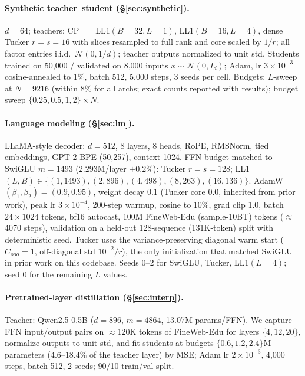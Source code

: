 \documentclass[11pt]{article}
\begin{document}
\paragraph{Synthetic teacher--student (\S\ref{sec:synthetic}).}
$d=64$; teachers: CP $=$ LL1$(B{=}32, L{=}1)$, LL1$(B{=}16, L{=}4)$, dense Tucker
$r{=}s{=}16$ with slices resampled to full rank and core scaled by $1/r$; all factor
entries i.i.d.\ $\mathcal N(0, 1/d)$; teacher outputs normalized to unit std. Students
trained on 50{,}000 / validated on 8{,}000 inputs $x\sim\mathcal N(0, I_d)$; Adam,
lr $3{\times}10^{-3}$ cosine-annealed to 1\%, batch 512, 5{,}000 steps, 3 seeds per
cell. Budgets: $L$-sweep at $N{=}9216$ (within 8\% for all archs; exact counts
reported with results); budget sweep $\{0.25, 0.5, 1, 2\}{\times}N$.

\paragraph{Language modeling (\S\ref{sec:lm}).}
LLaMA-style decoder: $d{=}512$, 8 layers, 8 heads, RoPE, RMSNorm, tied embeddings,
GPT-2 BPE (50{,}257), context 1024. FFN budget matched to SwiGLU $m{=}1493$
($2.293$M/layer $\pm 0.2\%$): Tucker $r{=}s{=}128$; LL1 $(L,B) \in
\{(1,1493),(2,896),(4,498),(8,263),(16,136)\}$. AdamW $(\beta_1,\beta_2)=(0.9,0.95)$,
weight decay 0.1 (Tucker core 0.0, inherited from prior work), peak lr
$3{\times}10^{-4}$, 200-step warmup, cosine to 10\%, grad clip 1.0, batch
$24\times1024$ tokens, bf16 autocast, 100M FineWeb-Edu (sample-10BT) tokens
($\approx$4070 steps), validation on a held-out 128-sequence (131K-token) split with
deterministic seed. Tucker uses the variance-preserving diagonal warm start
($C_{ooo}{=}1$, off-diagonal std $10^{-2}/r$), the only initialization that matched
SwiGLU in prior work on this codebase. Seeds 0--2 for SwiGLU, Tucker, LL1$(L{=}4)$;
seed 0 for the remaining $L$ values.

\paragraph{Pretrained-layer distillation (\S\ref{sec:interp}).}
Teacher: Qwen2.5-0.5B \citep{yang2024qwen25} ($d{=}896$, $m{=}4864$, 13.07M
params/FFN). We capture FFN input/output pairs on $\approx$120K tokens of FineWeb-Edu
for layers $\{4, 12, 20\}$, normalize outputs to unit std, and fit students at
budgets $\{0.6, 1.2, 2.4\}$M parameters ($4.6$--$18.4\%$ of the teacher layer) by
MSE; Adam lr $2{\times}10^{-3}$, 4{,}000 steps, batch 512, 2 seeds; 90/10
train/val split.
\end{document}
